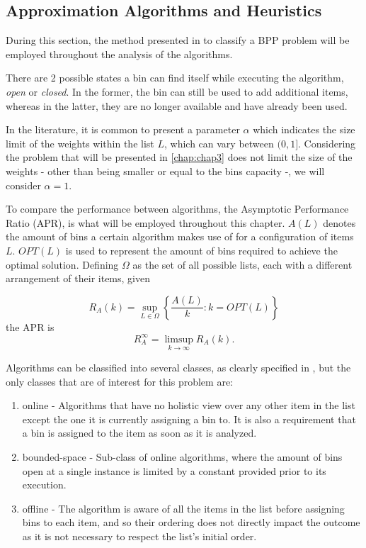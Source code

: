 \subsection{Approximation Algorithms and Heuristics}
\label{sub:Approximation Algorithms and Heuristics}

During this section, the method presented in \cite{coffman2013bin} to classify a BPP problem will be employed throughout the analysis of the algorithms.

There are 2 possible states a bin can find itself while executing the algorithm, \textit{open} or \textit{closed}. In the former, the bin can still be used to add additional items, whereas in the latter, they are no longer available and have already been used.

In the literature, it is common to present a parameter $\alpha$ which indicates the size limit of the weights within the list $L$, which can vary between \( (0, 1] \). Considering the problem that will be presented in \ref{chap:chap3} does not limit the size of the weights - other than being smaller or equal to the bins capacity -, we will consider $\alpha = 1$. 

To compare the performance between algorithms, the Asymptotic Performance Ratio (APR), is what will be employed throughout this chapter. $A(L)$ denotes the amount of bins a certain algorithm makes use of for a configuration of items $L$. $OPT(L)$ is used to represent the amount of bins required to achieve the optimal solution. Defining $\Omega$ as the set of all possible lists, each with a different arrangement of their items, given 

\begin{equation}
    R_A (k) = \sup_{L \in \Omega} \left \{ \frac{A(L)}{k} : k = OPT(L) \right \}
\end{equation}
the APR is
\begin{equation}
    R_A^\infty = \limsup_{k \to \infty} R_A(k).
\end{equation}

Algorithms can be classified into several classes, as clearly specified in \cite{coffman2013bin}, but the only classes that are of interest for this problem are:
\begin{enumerate}
    \item online - Algorithms that have no holistic view over any other item in the list except the one it is currently assigning a bin to. It is also a requirement that a bin is assigned to the item as soon as it is analyzed.
    \item bounded-space - Sub-class of online algorithms, where the amount of bins open at a single instance is limited by a constant provided prior to its execution.
    \item offline - The algorithm is aware of all the items in the list before assigning bins to each item, and so their ordering does not directly impact the outcome as it is not necessary to respect the list's initial order.
\end{enumerate}

